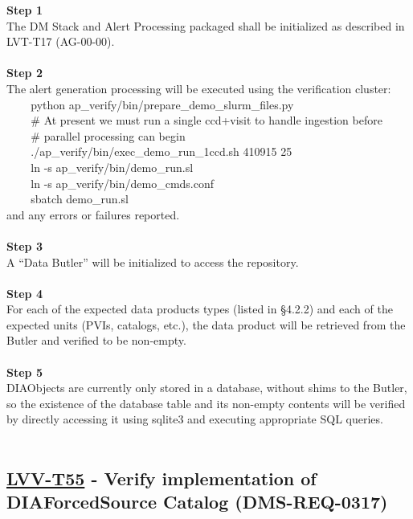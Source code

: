 \textbf{Step 1}\\
The DM Stack and Alert Processing packaged shall be initialized as
described in LVT-T17 (AG-00-00).\\
~\\
\textbf{Step 2}\\
The alert generation processing will be executed using the verification
cluster:\\
\hspace*{0.333em} ~ ~ ~python
ap\_verify/bin/prepare\_demo\_slurm\_files.py\\
\hspace*{0.333em} ~ ~ ~\# At present we must run a single ccd+visit to
handle ingestion before\\
\hspace*{0.333em} ~ ~ ~\# parallel processing can begin\\
\hspace*{0.333em} ~ ~ ~./ap\_verify/bin/exec\_demo\_run\_1ccd.sh 410915
25\\
\hspace*{0.333em} ~ ~ ~ln -s ap\_verify/bin/demo\_run.sl\\
\hspace*{0.333em} ~ ~ ~ln -s ap\_verify/bin/demo\_cmds.conf\\
\hspace*{0.333em} ~ ~ ~sbatch demo\_run.sl\\
and any errors or failures reported.\\
~\\
\textbf{Step 3}\\
A ``Data Butler'' will be initialized to access the repository.\\
~\\
\textbf{Step 4}\\
For each of the expected data products types (listed in §4.2.2) and each
of the expected units (PVIs, catalogs, etc.), the data product will be
retrieved from the Butler and verified to be non-empty.\\
~\\
\textbf{Step 5}\\
DIAObjects are currently only stored in a database, without shims to the
Butler, so the existence of the database table and its non-empty
contents will be verified by directly accessing it using sqlite3 and
executing appropriate SQL queries.\\
~\\

\hypertarget{lvv-t55---verify-implementation-of-diaforcedsource-catalog-dms-req-0317}{%
\subsection{\texorpdfstring{\href{https://jira.lsstcorp.org/secure/Tests.jspa\#/testCase/LVV-T55}{LVV-T55}
- Verify implementation of DIAForcedSource Catalog
(DMS-REQ-0317)}{LVV-T55 - Verify implementation of DIAForcedSource Catalog (DMS-REQ-0317)}}\label{lvv-t55---verify-implementation-of-diaforcedsource-catalog-dms-req-0317}}

